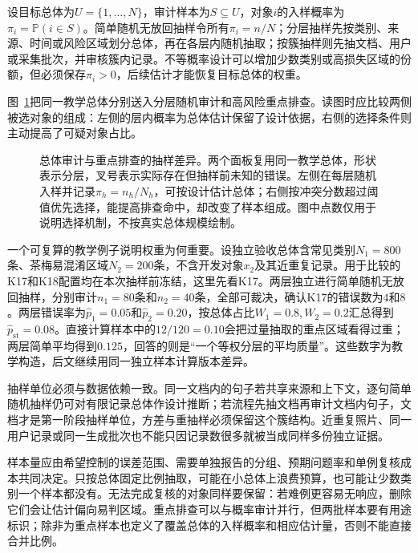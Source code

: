 设目标总体为$U=\{1,\ldots,N\}$，审计样本为$S\subseteq U$，对象$i$的入样概率为$\pi_i=\mathbb{P}(i\in S)$。简单随机无放回抽样令所有$\pi_i=n/N$；分层抽样先按类别、来源、时间或风险区域划分总体，再在各层内随机抽取；按簇抽样则先抽文档、用户或采集批次，并审核簇内记录。不等概率设计可以增加少数类别或高损失区域的份额，但必须保存$\pi_i>0$，后续估计才能恢复目标总体的权重。

图~\ref{fig:knowledge-quality-assessment-correction-audit-sampling}把同一教学总体分别送入分层随机审计和高风险重点排查。读图时应比较两侧被选对象的组成：左侧的层内概率为总体估计保留了设计依据，右侧的选择条件则主动提高了可疑对象占比。

\begin{figure}[htbp]
  \centering
  
  \caption{总体审计与重点排查的抽样差异。两个面板复用同一教学总体，形状表示分层，叉号表示实际存在但抽样前未知的错误。左侧在每层随机入样并记录$\pi_h=n_h/N_h$，可按设计估计总体；右侧按冲突分数超过阈值优先选择，能提高排查命中，却改变了样本组成。图中点数仅用于说明选择机制，不按真实总体规模绘制。}
  \label{fig:knowledge-quality-assessment-correction-audit-sampling}
\end{figure}

一个可复算的教学例子说明权重为何重要。设独立验收总体含常见类别$N_1=800$条、茶梅易混淆区域$N_2=200$条，不含开发对象$x_2$及其近重复记录。用于比较的K17和K18配置均在本次抽样前冻结，这里先看K17。两层独立进行简单随机无放回抽样，分别审计$n_1=80$条和$n_2=40$条，全部可裁决，确认K17的错误数为$4$和$8$。两层错误率为$\widehat p_1=0.05$和$\widehat p_2=0.20$，按总体占比$W_1=0.8,W_2=0.2$汇总得到$\widehat p_{\mathrm{st}}=0.08$。直接计算样本中的$12/120=0.10$会把过量抽取的重点区域看得过重；两层简单平均得到$0.125$，回答的则是“一个等权分层的平均质量”。这些数字为教学构造，后文继续用同一独立样本计算版本差异。

抽样单位必须与数据依赖一致。同一文档内的句子若共享来源和上下文，逐句简单随机抽样仍可对有限记录总体作设计推断；若流程先抽文档再审计文档内句子，文档才是第一阶段抽样单位，方差与重抽样必须保留这个簇结构。近重复照片、同一用户记录或同一生成批次也不能只因记录数很多就被当成同样多份独立证据。

样本量应由希望控制的误差范围、需要单独报告的分组、预期问题率和单例复核成本共同决定。只按总体固定比例抽取，可能在小总体上浪费预算，也可能让少数类别一个样本都没有。无法完成复核的对象同样要保留：若难例更容易无响应，删除它们会让估计偏向易判区域。重点排查可以与概率审计并行，但两批样本要有用途标识；除非为重点样本也定义了覆盖总体的入样概率和相应估计量，否则不能直接合并比例。

